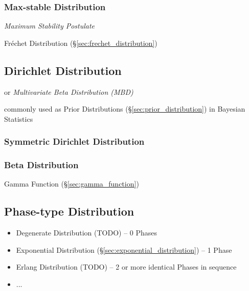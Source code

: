 \subsubsection{Max-stable Distribution}\label{sec:max_stable}

\emph{Maximum Stability Postulate}

Fr\'echet Distribution (\S\ref{sec:frechet_distribution})



\subsection{Dirichlet Distribution}\label{sec:dirichlet_distribution}

or \emph{Multivariate Beta Distribution (MBD)}

commonly used as Prior Distributions (\S\ref{sec:prior_distribution}) in
Bayesian Statistics



\subsubsection{Symmetric Dirichlet Distribution}\label{sec:symmetric_dirichlet}

\subsubsection{Beta Distribution}\label{sec:beta_distribution}

Gamma Function (\S\ref{sec:gamma_function})



\subsection{Phase-type Distribution}\label{sec:phasetype_distribution}

\begin{itemize}
  \item Degenerate Distribution (TODO) -- 0
    Phases
  \item Exponential Distribution (\S\ref{sec:exponential_distribution}) -- 1
    Phase
  \item Erlang Distribution (TODO) -- 2 or more identical Phases in sequence
  \item ...
\end{itemize}



